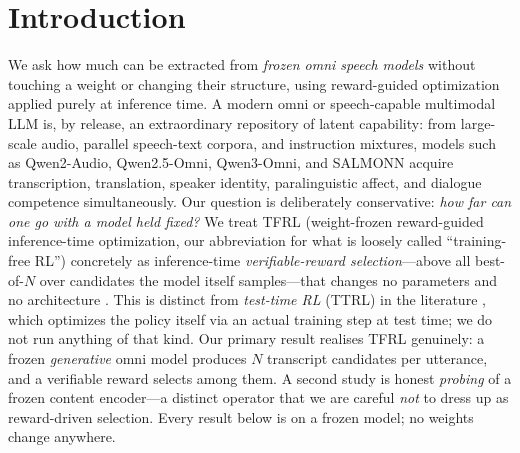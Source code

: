 \begin{abstract}
(layer/pooling, not selection over model-sampled candidates) yields no significant emotion gain ($95\%$ CI $[-0.043,+0.116]$). On MInDS-14 tool/intent identification, a clean factorial separating instruction wording from candidate-card content shows the true zero-shot condition (instruction only, no examples) \emph{regresses} $-0.245$ ($95\%$ CI $[-0.286,-0.201]$) relative to a naive baseline; the previously reported gain was driven almost entirely by in-set example cards ($+0.246$), with the pure instruction-on-cards effect only $+0.015$---neither zero-shot nor a reward-guided-RL result. We state the caveats plainly: llama.cpp audio input is experimental upstream; snr5 is a robustness perturbation chosen for measurable headroom; the oracle uses the reference and is an upper bound, not deployable. All results are on frozen models with committed reproduction artifacts, internally re-verified by adversarial AI agents (not an independent team).
\end{abstract}

\section{Introduction}
\label{sec:intro}

We ask how much can be extracted from \emph{frozen omni speech models} without touching a weight or changing their structure, using reward-guided optimization applied purely at inference time. A modern omni or speech-capable multimodal LLM is, by release, an extraordinary repository of latent capability: from large-scale audio, parallel speech-text corpora, and instruction mixtures, models such as Qwen2-Audio, Qwen2.5-Omni, Qwen3-Omni, and SALMONN \citep{qwen2audio,qwen25omni,qwen3omni,salmonn2023} acquire transcription, translation, speaker identity, paralinguistic affect, and dialogue competence simultaneously. Our question is deliberately conservative: \emph{how far can one go with a model held fixed?} We treat TFRL (weight-frozen reward-guided inference-time optimization, our abbreviation for what is loosely called ``training-free RL'') concretely as inference-time \emph{verifiable-reward selection}---above all best-of-$N$ over candidates the model itself samples---that changes no parameters and no architecture \citep{beirami2024bon,mudgal2024controlled}. This is distinct from \emph{test-time RL} (TTRL) in the literature \citep{zuo2025ttrl}, which optimizes the policy itself via an actual training step at test time; we do not run anything of that kind. Our primary result realises TFRL genuinely: a frozen \emph{generative} omni model produces $N$ transcript candidates per utterance, and a verifiable reward selects among them. A second study is honest \emph{probing} of a frozen content encoder---a distinct operator that we are careful \emph{not} to dress up as reward-driven selection. Every result below is on a frozen model; no weights change anywhere.

